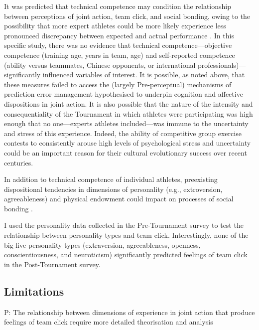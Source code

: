 \begin{CJK}{UTF8}{gbsn}
It was predicted that technical competence may condition the relationship between perceptions of joint action, team click, and social bonding, owing to the possibility that more expert athletes could be more likely experience less pronounced discrepancy between expected and actual performance \cite{Tomeo2012}.  In this specific study, there was no evidence that technical competence---objective competence (training age, years in team, age) and self-reported competence (ability versus teammates, Chinese opponents, or international professionals)---significantly influenced variables of interest.  It is possible, as noted above, that these measures failed to access the (largely Pre-perceptual) mechanisms of prediction error management hypothesised to underpin cognition and affective dispositions in joint action.  It is also possible that the nature of the intensity and consequentiality of the Tournament in which athletes were participating was high enough that no one---experts athletes included---was immune to the uncertainty and stress of this experience. Indeed, the ability of competitive group exercise contests to consistently arouse high levels of psychological stress and uncertainty could be an important reason for their cultural evolutionary success over recent centuries.

In addition to technical competence of individual athletes, preexisting dispositional tendencies in dimensions of personality (e.g., extroversion, agreeableness) and physical endowment could impact on processes of social bonding \citep{Marsh2009,VonRueden2015}.

I used the personality data collected in the Pre-Tournament survey to test the relationship between personality types and team click. Interestingly, none of the big five personality types (extraversion, agreeableness, openness, conscientiousness, and neuroticism) significantly predicted feelings of team click in the Post-Tournament survey.




\subsection{Limitations}

P: The relationship between dimensions of experience in joint action that produce feelings of team click require more detailed theorisation and analysis


\end{CJK}
